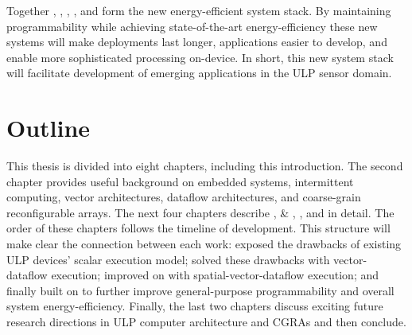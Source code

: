 Together \sonic, \manic, \manicsilicon, \snafu, and \riptide form the new energy-efficient system stack.
% 
By maintaining programmability while achieving state-of-the-art energy-efficiency these new systems will make deployments last longer, applications easier to develop, and enable more sophisticated processing on-device.
% 
In short, this new system stack will facilitate development of emerging applications in the ULP sensor domain.

\section{Outline}
This thesis is divided into eight chapters, including this introduction.
%
The second chapter provides useful background on embedded systems, intermittent computing, vector architectures, dataflow architectures, and coarse-grain reconfigurable arrays.
% 
The next four chapters describe \sonic, \manic \& \manicsilicon, \snafu, and \riptide in detail.
% 
The order of these chapters follows the timeline of development.
% 
This structure will make clear the connection between each work:
% 
\sonic exposed the drawbacks of existing ULP devices' scalar execution model; \manic solved these drawbacks with vector-dataflow execution; \snafu improved on \manic with spatial-vector-dataflow execution; and finally \riptide built on \snafu to further improve general-purpose programmability and overall system energy-efficiency.
% 
Finally, the last two chapters discuss exciting future research directions in ULP computer architecture and CGRAs and then conclude.
